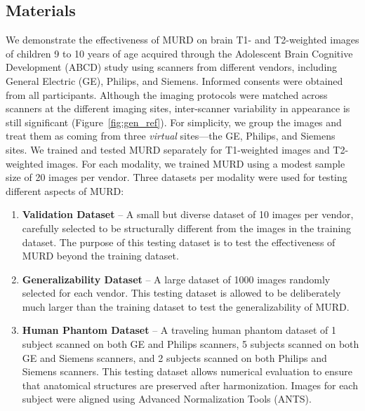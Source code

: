 \documentclass{nature}
\begin{document}
\subsection{Materials}
We demonstrate the effectiveness of MURD on brain T1- and T2-weighted images of children 9 to 10 years of age
acquired through the Adolescent Brain Cognitive Development (ABCD) study\cite{Jernigan2018The} using scanners from different vendors, including General Electric (GE), Philips, and Siemens. Informed consents were obtained from all participants\cite{Jernigan2018The}.
Although the imaging protocols were matched across scanners at the different imaging sites\cite{Casey2018ABCD}, inter-scanner variability in appearance is still significant (Figure~\ref{fig:gen_ref}).
%
For simplicity, we group the images and treat them as coming from three \emph{virtual} sites---the GE, Philips, and Siemens sites.
%
We trained and tested MURD separately for T1-weighted images and T2-weighted images. For each modality, we trained MURD using a modest sample size of 20 images 
 per vendor. Three datasets per modality were used for testing different aspects of MURD:
\vspace{-\baselineskip}
\begin{enumerate}[itemsep=0pt,topsep=0pt,partopsep=0pt,parsep=0pt,label=(\roman{enumi})]
	\item \textbf{Validation Dataset} -- A small but diverse dataset of 10 images 
	per vendor, carefully selected to be structurally different from the images in the training dataset. The purpose of this testing dataset is to test the effectiveness of MURD beyond the training dataset.
	\item \textbf{Generalizability Dataset} -- A large dataset of 1000 images 
	randomly selected for each vendor. This testing dataset is allowed to be deliberately much larger than the training dataset to test the generalizability of MURD.
	\item \textbf{Human Phantom Dataset} -- A traveling human phantom dataset of 1 subject scanned on both GE and Philips scanners, 5 subjects scanned on both GE and Siemens scanners, and 2 subjects scanned on both Philips and Siemens scanners. This testing dataset allows numerical evaluation to ensure that anatomical structures are preserved after harmonization. Images for each subject were aligned using Advanced Normalization Tools (ANTS)\cite{Avants2009Advanced}.
\end{enumerate}
\end{document}
